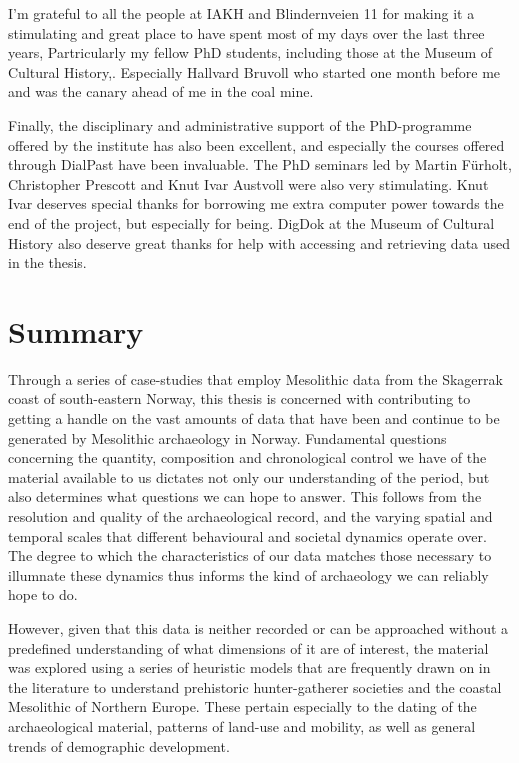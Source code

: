 I'm grateful to all the people at IAKH and Blindernveien 11 for making it a stimulating and great place to have spent most of my days over the last three years, Partricularly my fellow PhD students, including those at the Museum of Cultural History,. Especially Hallvard Bruvoll who started one month before me and was the canary ahead of me in the coal mine.

Finally, the disciplinary and administrative support of the PhD-programme offered by the institute has also been excellent, and especially the courses offered through DialPast have been invaluable. The PhD seminars led by Martin Fürholt, Christopher Prescott and Knut Ivar Austvoll were also very stimulating. Knut Ivar deserves special thanks for borrowing me extra computer power towards the end of the project, but especially for being.  DigDok at the Museum of Cultural History also deserve great thanks for help with accessing and retrieving data used in the thesis.


\section*{Summary}
Through a series of case-studies that employ Mesolithic data from the Skagerrak coast of south-eastern Norway, this thesis is concerned with contributing to getting a handle on the vast amounts of data that have been and continue to be generated by Mesolithic archaeology in Norway. Fundamental questions concerning the quantity, composition and chronological control we have of the material available to us dictates not only our understanding of the period, but also determines what questions we can hope to answer. This follows from the resolution and quality of the archaeological record, and the varying spatial and temporal scales that different behavioural and societal dynamics operate over. The degree to which the characteristics of our data matches those necessary to illumnate these dynamics thus informs the kind of archaeology we can reliably hope to do.   

However, given that this data is neither recorded or can be approached without a predefined understanding of what dimensions of it are of interest, the material was explored using a series of heuristic models that are frequently drawn on in the literature to understand prehistoric hunter-gatherer societies and the coastal Mesolithic of Northern Europe. These pertain especially to the dating of the archaeological material, patterns of land-use and mobility, as well as general trends of demographic development. 

